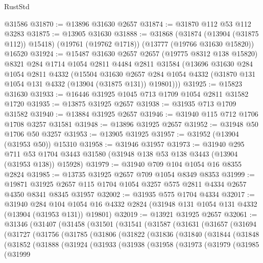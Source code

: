 \begin{lexlean}{RustStd}
\begin{coremodule}
    @31586
@31870 := @13896 @31630 @2657
@31874 := @31870 @112 @53 @112 @3283
@31875 := @13905 @31630
@31888 := @31868
    (@31874 (@13904 (@31875 @112)) @15418)
    (@19761 (@19762 @1718))
    (@13777 (@19766 @31630 @15820))
    @16520
@31924 := @15487
    @31630
    @2657
    @2657
    (@19775 @8312 @138 @15820)
    @8321
    @284
    @1714
    @1054
    @2811
    @4484
    @2811
    @31584
    (@13696
      @31630
      @284
      @1054
      @2811
      @4332
      (@15504
        @31630
        @2657
        @284
        @1054
        @4332
        (@31870 @131 @1054 @131 @4332 (@13904 (@31875 @131)) @19801)))
@31925 := @15823 @31630
@31933 := @16446 @31925 @1045 @713 @1709 @1054 @2811 @31582 @1720
@31935 := @13875 @31925 @2657
@31938 := @31935 @713 @1709 @31582
@31940 := @13884 @31925 @2657
@31946 := @31940 @115 @712 @1706 @1708 @3257 @31581
@31948 := @13896 @31925 @2657
@31952 := @31948 @50 @1706 @50 @3257
@31953 := @13905 @31925
@31957 := @31952 (@13904 (@31953 @50)) @15310
@31958 := @31946 @31957
@31973 := @31940
    @295
    @711
    @53
    @1704
    @3443
    @31580
    (@31948 @138 @53 @138 @3443 (@13904 (@31953 @138)) @15928)
@31979 := @31940 @709 @104 @1054 @16 @8355 @2824
@31985 := @13735 @31925 @2657 @709 @1054 @8349 @8353
@31999 := @19871 @31925 @2657 @115 @1704 @1054 @3257 @575 @2811 @4334 @2657 @4350 @8341 @8345 @31957
@32002 := @31935 @575 @1704 @4334
@32017 := @31940
    @284
    @104
    @1054
    @16
    @4332
    @2824
    (@31948 @131 @1054 @131 @4332 (@13904 (@31953 @131)) @19801)
@32019 := @13921 @31925 @2657
@32061 := @31346
    (@31407
      (@31458
        (@31501
          (@31541
            (@31587
              (@31631
                (@31657
                  (@31694
                    (@31727
                      (@31756
                        (@31785
                          (@31806
                            (@31822
                              (@31836
                                (@31840
                                  (@31844
                                    (@31848
                                      (@31852
                                        (@31888
                                          (@31924
                                            (@31933
                                              (@31938
                                                (@31958
                                                  (@31973
                                                    (@31979
                                                      (@31985
                                                        (@31999

\end{coremodule}
\end{lexlean}
